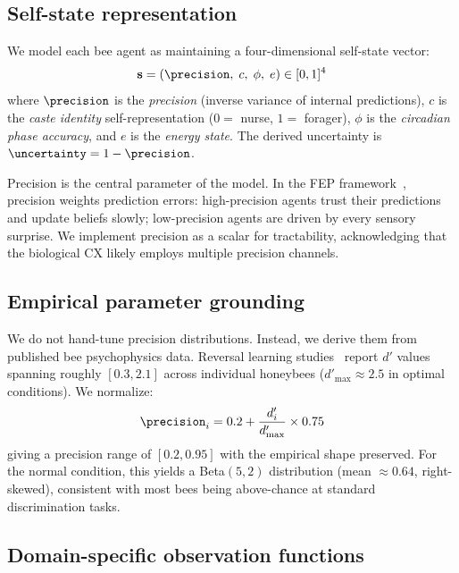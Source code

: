 \subsection*{Self-state representation}
\label{sec:model:state}

We model each bee agent as maintaining a four-dimensional self-state vector:
\begin{equation}
  \mathbf{s} = (\precision,\; c,\; \phi,\; e) \in [0,1]^4
\end{equation}
where $\precision$ is the \emph{precision} (inverse variance of internal predictions), $c$ is the
\emph{caste identity} self-representation ($0 =$ nurse, $1 =$ forager), $\phi$ is the
\emph{circadian phase accuracy}, and $e$ is the \emph{energy state}. The derived uncertainty is
$\uncertainty = 1 - \precision$.

Precision is the central parameter of the model. In the FEP framework~\cite{Friston2010},
precision weights prediction errors: high-precision agents trust their predictions and update beliefs
slowly; low-precision agents are driven by every sensory surprise. We implement precision as a scalar
for tractability, acknowledging that the biological CX likely employs multiple precision channels.

\subsection*{Empirical parameter grounding}
\label{sec:model:empirical}

We do not hand-tune precision distributions. Instead, we derive them from published bee psychophysics
data. Reversal learning studies~\cite{AvarWeber2012} report $d'$ values spanning roughly $[0.3, 2.1]$
across individual honeybees ($d'_{\max} \approx 2.5$ in optimal conditions). We normalize:
\begin{equation}
  \precision_i = 0.2 + \frac{d'_i}{d'_{\max}} \times 0.75
\end{equation}
giving a precision range of $[0.2, 0.95]$ with the empirical shape preserved. For the normal condition,
this yields a Beta$(5, 2)$ distribution (mean $\approx 0.64$, right-skewed), consistent with most bees
being above-chance at standard discrimination tasks.

\subsection*{Domain-specific observation functions}
\label{sec:model:domains}

